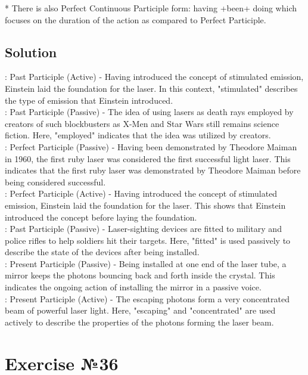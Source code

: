 * There is also Perfect Continuous Participle form: having +been+ doing which focuses
on the duration of the action as compared to Perfect Participle.

\subsection*{Solution}
: Past Participle (Active) - Having introduced the concept of
stimulated emission, Einstein laid the foundation for the laser. In this context,
"stimulated" describes the type of emission that Einstein introduced. \\
: Past Participle (Passive) - The idea of using lasers as death
rays employed by creators of such blockbusters as X-Men and Star Wars still remains
science fiction. Here, "employed" indicates that the idea was utilized by creators. \\
: Perfect Participle (Passive) - Having been
demonstrated by Theodore Maiman in 1960, the first ruby laser was considered the first
successful light laser. This indicates that the first ruby laser was demonstrated by
Theodore Maiman before being considered successful. \\
: Perfect Participle (Active) - Having introduced the
concept of stimulated emission, Einstein laid the foundation for the laser. This shows
that Einstein introduced the concept before laying the foundation. \\
: Past Participle (Passive) - Laser-sighting devices
are fitted to military and police rifles to help soldiers hit their targets. Here,
"fitted" is used passively to describe the state of the devices after being installed. \\
: Present Participle (Passive) - Being installed at one end
of the laser tube, a mirror keeps the photons bouncing back and forth inside the crystal.
This indicates the ongoing action of installing the mirror in a passive voice. \\
: Present Participle (Active) - The escaping photons
form a very concentrated beam of powerful laser light. Here, "escaping" and
"concentrated" are used actively to describe the properties of the photons forming the
laser beam.

\section{Exercise №36}
